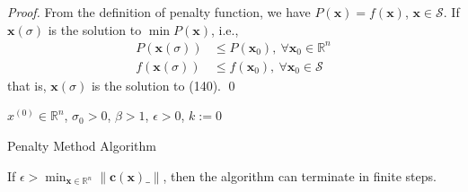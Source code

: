 \documentclass[runningheads]{llncs}
\begin{document}
\begin{proof}
    From the definition of penalty function,
    we have $P(\mathbf{x}) = f(\mathbf{x})$,
    $\mathbf{x} \in \mathcal{S}$.
    If $\mathbf{x}(\sigma)$ is the solution to 
    $\min P(\mathbf{x})$, i.e.,
    \begin{align}
        P(\mathbf{x}(\sigma)) &\leq P(\mathbf{x}_0), \ \forall
        \mathbf{x}_0 \in \mathbb{R}^{n} \\
        f(\mathbf{x}(\sigma)) &\leq f(\mathbf{x}_0), \ \forall
        \mathbf{x}_0 \in \mathcal{S}
    \end{align}
that is, $\mathbf{x}(\sigma)$ is the solution to (140).
\qed
\end{proof}

\begin{algorithm}[H]
    \SetAlgoLined
     $x^{(0)} \in \mathbb{R}^n$, $\sigma_0 > 0$, $\beta > 1$,
     $\epsilon > 0$, $k:= 0$\;
     \caption{Penalty Method Algorithm}
\end{algorithm}

\begin{theorem}
    If $\epsilon > \min_{\mathbf{x} \in \mathbb{R}^n}
    \parallel \mathbf{c}(\mathbf{x})\_ \parallel$,
    then the algorithm can terminate in finite steps.
\end{theorem}
\end{document}
